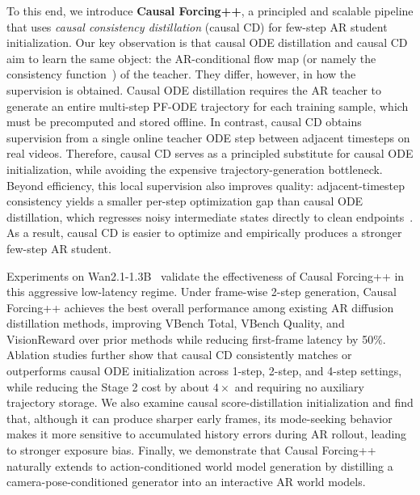\documentclass{llmxive}
\begin{document}
To this end, we introduce \textbf{Causal Forcing++}, a principled and scalable pipeline that uses \emph{causal consistency distillation} (causal CD) for few-step AR student initialization. Our key observation is that causal ODE distillation and causal CD aim to learn the same object: the AR-conditional flow map (or namely the consistency function~\cite{song2023consistency,wang2024phased,lu2024simplifying,zheng2025large}) of the teacher. They differ, however, in how the supervision is obtained. Causal ODE distillation requires the AR teacher to generate an entire multi-step PF-ODE trajectory for each training sample, which must be precomputed and stored offline. In contrast, causal CD obtains supervision from a single online teacher ODE step between adjacent timesteps on real videos. Therefore, causal CD serves as a principled substitute for causal ODE initialization, while avoiding the expensive trajectory-generation bottleneck. Beyond efficiency, this local supervision also improves quality: adjacent-timestep consistency yields a smaller per-step optimization gap than causal ODE distillation, which regresses noisy intermediate states directly to clean endpoints~\cite{liu2023instaflow}. As a result, causal CD is easier to optimize and empirically produces a stronger few-step AR student.

Experiments on Wan2.1-1.3B~\cite{wan2025wan} validate the effectiveness of Causal Forcing++ in this aggressive low-latency regime. Under frame-wise 2-step generation, Causal Forcing++ achieves the best overall performance among existing AR diffusion distillation methods, improving VBench Total, VBench Quality, and VisionReward over prior methods while reducing first-frame latency by 50\%. Ablation studies further show that causal CD consistently matches or outperforms causal ODE initialization across 1-step, 2-step, and 4-step settings, while reducing the Stage 2 cost by about $4\times$ and requiring no auxiliary trajectory storage. We also examine causal score-distillation initialization and find that, although it can produce sharper early frames, its mode-seeking behavior makes it more sensitive to accumulated history errors during AR rollout, leading to stronger exposure bias. Finally, we demonstrate that Causal Forcing++ naturally extends to action-conditioned world model generation by distilling a camera-pose-conditioned generator into an interactive AR world models. 
\end{document}
